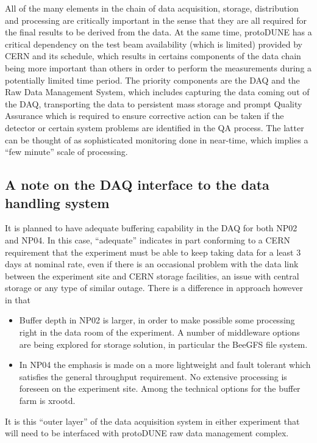 All of the many elements in the chain of data acquisition, storage, distribution and processing are critically important in the sense that they are all required for the final results to be derived from the data. At the same time, protoDUNE has a critical dependency on the test beam availability (which is limited) provided by CERN and its schedule, which results in certains components of the data chain being more important than others in order to perform the measurements during a potentially limited time period. The priority components are the DAQ and the Raw Data Management System, which includes capturing the data coming out of the DAQ, transporting the data to persistent mass storage and prompt Quality Assurance which is required to ensure corrective action can be taken if the detector or certain system problems are identified in the QA process. The latter can be thought of as sophisticated monitoring done in near-time, which implies a ``few minute'' scale of processing.



\subsection{A note on the DAQ interface to the data handling system}

It is planned to have adequate buffering capability in the DAQ for both NP02 and NP04. In this case, “adequate” indicates in part conforming to a CERN requirement that the experiment must be able to keep taking data for a least 3 days at nominal rate, even if there is an occasional problem with the data link between the experiment site and CERN storage facilities, an issue with central storage or any type of similar outage. There is a difference in approach however in that
\begin{itemize}
\item Buffer depth in NP02 is larger, in order to make possible some processing right in the data room of the experiment. A number of middleware options are being explored for storage solution, in particular the BeeGFS file system.
\item In NP04 the emphasis is made on a more lightweight and fault tolerant which satisfies the general throughput requirement. No extensive processing is foreseen on the experiment site. Among the technical options for the buffer farm is xrootd.
\end{itemize}

\noindent
It is this “outer layer” of the data acquisition system in either experiment that will need to be interfaced with protoDUNE raw data management complex.

